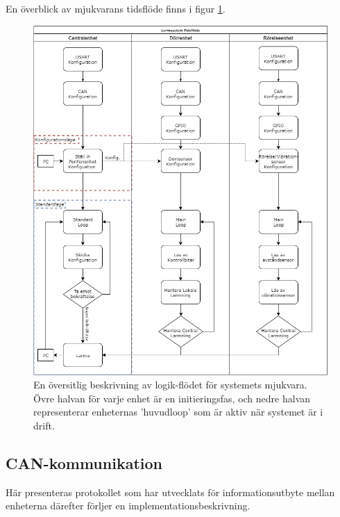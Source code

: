 \documentclass{article}
\begin{document}
En överblick av mjukvarans tidsflöde finns i figur \ref{fig:tidsflöde}.

\begin{figure}[H]
    \centering
    \includegraphics[width=1\textwidth]{figurer/TidsFlode.jpg}
    \caption{En översitlig beskrivning av logik-flödet för systemets mjukvara. Övre halvan för varje enhet är en initieringsfas,
    och nedre halvan representerar enheternas 'huvudloop' som är aktiv när systemet är i drift.}
    \label{fig:tidsflöde}
\end{figure}

\subsection{CAN-kommunikation}
\label{can}
Här presenteras protokollet som har utvecklats för informationsutbyte mellan enheterna därefter förljer en implementationsbeskrivning.
\end{document}
